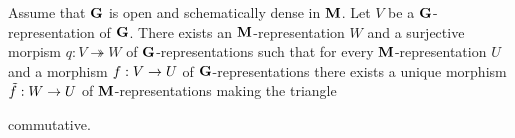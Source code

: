 \begin{theorem}
Assume that $\mathbf{G}$ is open and schematically dense in $\mathbf{M}$. Let $V$ be a $\mathbf{G}$-representation of $\mathbf{G}$. There exists an $\mathbf{M}$-representation $W$ and a surjective morpism $q:V\twoheadrightarrow W$ of $\mathbf{G}$-representations such that for every $\mathbf{M}$-representation $U$ and a morphism $f:V\rightarrow U$ of $\mathbf{G}$-representations there exists a unique morphism $\tilde{f}:W\rightarrow U$ of $\mathbf{M}$-representations making the triangle
\begin{center}
\end{center}
commutative.
\end{theorem}
